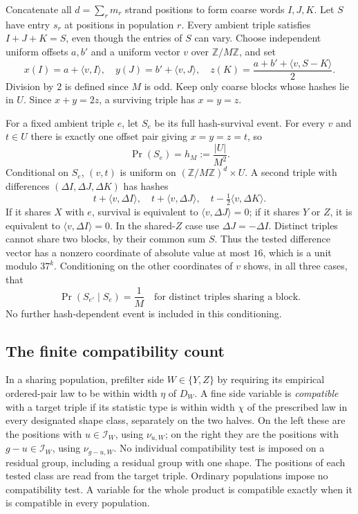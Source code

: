Concatenate all $d=\sum_r m_r$ strand positions to form coarse words
$I,J,K$.
Let $S$ have entry $s_r$ at positions in population $r$.  Every
ambient triple satisfies $I+J+K=S$, even though the entries of $S$
can vary.  Choose independent uniform offsets $a,b'$ and a uniform
vector $v$ over $\mathbb Z/M\mathbb Z$, and set
\begin{equation}\label{eq:joint-hashes}
 x(I)=a+\langle v,I\rangle,\quad
 y(J)=b'+\langle v,J\rangle,\quad
 z(K)=\frac{a+b'+\langle v,S-K\rangle}{2}.
\end{equation}
Division by $2$ is defined since $M$ is odd.  Keep only coarse blocks
whose hashes lie in $U$.  Since $x+y=2z$, a surviving triple has
$x=y=z$.

For a fixed ambient triple $e$, let $S_e$ be its full hash-survival
event.  For every $v$ and $t\in U$ there is exactly one offset pair
giving $x=y=z=t$, so
\begin{equation}\label{eq:hash-survival}
 \Pr(S_e)=h_M:=\frac{|U|}{M^2}.
\end{equation}
Conditional on $S_e$, $(v,t)$ is uniform on
$(\mathbb Z/M\mathbb Z)^d\times U$.  A second triple with
differences $(\Delta I,\Delta J,\Delta K)$ has hashes
\[
 t+\langle v,\Delta I\rangle,\quad
 t+\langle v,\Delta J\rangle,\quad
 t-\tfrac12\langle v,\Delta K\rangle.
\]
If it shares $X$ with $e$, survival is equivalent to
$\langle v,\Delta J\rangle=0$; if it shares $Y$ or $Z$, it is
equivalent to $\langle v,\Delta I\rangle=0$.  In the shared-$Z$
case use $\Delta J=-\Delta I$.  Distinct triples cannot share two
blocks, by their common sum $S$.  Thus the tested difference vector
has a nonzero coordinate of absolute value at most $16$, which is
a unit modulo $37^k$.  Conditioning on the other coordinates of
$v$ shows, in all three cases, that
\begin{equation}\label{eq:hash-collision}
 \Pr(S_{e'}\mid S_e)=\frac1M
 \quad\text{for distinct triples sharing a block}.
\end{equation}
No further hash-dependent event is included in this conditioning.

\subsection{The finite compatibility count}

In a sharing population, prefilter side $W\in\{Y,Z\}$ by requiring
its empirical ordered-pair law to be within width $\eta$ of $D_W$.
A fine side variable is \emph{compatible} with a target triple if
its statistic type is within width $\chi$ of the prescribed law
in every designated shape class, separately on the two halves.
On the left these are the positions with $u\in\mathcal I_W$, using
$\nu_{u,W}$; on the right they are the positions with
$g-u\in\mathcal I_W$, using $\nu_{g-u,W}$.
No individual compatibility test is imposed on a residual group,
including a residual group with one shape.
The positions of each tested class are read from the target triple.
Ordinary populations impose no compatibility test.  A variable for
the whole product is compatible exactly when it is compatible in
every population.

